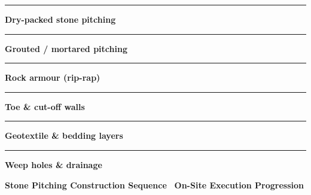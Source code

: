 \documentclass[a4paper,11pt]{article}
\providecommand{\faMountain}{\faLayerGroup}
\begin{document}
\begin{minipage}[t]{0.34\textwidth}
    \vspace{0pt}
    \begin{tcolorbox}[
        enhanced, colback=mhoffwhite, colframe=mhnavy, boxrule=0.8pt, arc=4pt,
        title={\bfseries\color{white}\faMountain\ Pitching Scope of Work},
        colbacktitle=mhnavy, left=7pt, right=7pt, top=5pt, bottom=5pt,
        drop shadow=black!4
    ]
        \fontsize{7.8pt}{11.0pt}\selectfont
        \textcolor{mhnavy}{\rule{3.5pt}{3.5pt}}\hspace{4pt}\textbf{Dry-packed stone pitching}\\
        \textcolor{mhnavy}{\rule{3.5pt}{3.5pt}}\hspace{4pt}\textbf{Grouted / mortared pitching}\\
        \textcolor{mhnavy}{\rule{3.5pt}{3.5pt}}\hspace{4pt}\textbf{Rock armour (rip-rap)}\\
        \textcolor{mhnavy}{\rule{3.5pt}{3.5pt}}\hspace{4pt}\textbf{Toe \& cut-off walls}\\
        \textcolor{mhnavy}{\rule{3.5pt}{3.5pt}}\hspace{4pt}\textbf{Geotextile \& bedding layers}\\
        \textcolor{mhnavy}{\rule{3.5pt}{3.5pt}}\hspace{4pt}\textbf{Weep holes \& drainage}
    \end{tcolorbox}
\end{minipage}

\vfill

\noindent
{\large\bfseries\color{mhnavy} Stone Pitching Construction Sequence} \hfill {\fontsize{7.4pt}{9.2pt}\selectfont\color{mhblue}\bfseries\faCamera\ On-Site Execution Progression}
\vspace{0.08cm}
\end{document}
